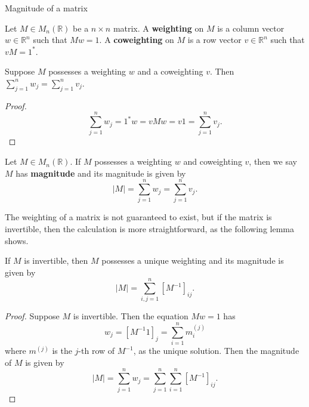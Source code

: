 \documentclass[12pt]{beamer}
\begin{document}
\begin{frame}[allowframebreaks]{Magnitude of a matrix}

\begin{definition}
Let $M \in M_n(\mathbb{R})$ be a $n\times n$ matrix. A \textbf{weighting} on $M$ is a column vector $w\in\mathbb{R}^n$ such that $Mw = 1$. A \textbf{coweighting} on $M$ is a row vector $v\in\mathbb{R}^n$ such that $vM = 1^\ast$.
\end{definition}

\framebreak

\begin{lemma}
Suppose $M$ possesses a weighting $w$ and a coweighting $v$. Then $\sum\limits_{j=1}^n w_j = \sum\limits_{j=1}^n v_j$.
\end{lemma}

\begin{proof}
\begin{equation*}
\sum\limits_{j=1}^nw_j = 1^\ast w = vMw = v1 = \sum\limits_{j=1}^nv_j.
\end{equation*}
\end{proof}

\framebreak

\begin{definition}
Let $M \in M_n(\mathbb{R})$. If $M$ possesses a weighting $w$ and coweighting $v$, then we say $M$ has \textbf{magnitude} and its magnitude is given by
\begin{equation*}
\vert M \vert = \sum\limits_{j=1}^nw_j = \sum\limits_{j=1}^nv_j.
\end{equation*}
\end{definition}

The weighting of a matrix is not guaranteed to exist, but if the matrix is invertible, then the calculation is more straightforward, as the following lemma shows.

\framebreak

\begin{lemma}\label{lem:invertible}
If $M$ is invertible, then $M$ possesses a unique weighting and its magnitude is given by
\begin{equation*}
\vert M \vert = \sum\limits_{i,j=1}^n\left[M^{-1}\right]_{ij}.
\end{equation*}
\end{lemma}

\framebreak

\begin{proof}
Suppose $M$ is invertible. Then the equation $Mw = 1$
has
\begin{equation*}
w_j = \left[M^{-1}1\right]_j = \sum\limits_{i=1}^n m^{(j)}_i
\end{equation*}
where $m^{(j)}$ is the $j$-th row of $M^{-1}$, as the unique solution. Then the magnitude of $M$ is given by
\begin{equation*}
\vert M \vert = \sum\limits_{j=1}^n w_j = \sum\limits_{j=1}^n\sum\limits_{i=1}^n \left[M^{-1}\right]_{ij}.
\end{equation*}
\end{proof}

\end{frame}
\end{document}
